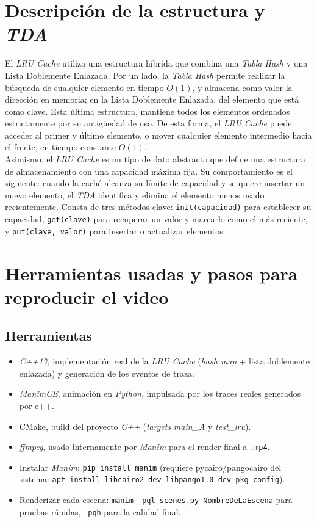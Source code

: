 \documentclass[a4paper, table]{article}
\begin{document}
\newpage

\section{Descripción de la estructura y \textit{TDA}}

El \textit{LRU Cache} utiliza una estructura híbrida que combina una \textit{Tabla Hash} y una Lista Doblemente Enlazada. Por un lado, la \textit{Tabla Hash} permite realizar la búsqueda de cualquier elemento en tiempo $O(1)$, y almacena como valor la dirección en memoria; en la Lista Doblemente Enlazada, del elemento que está como clave. Esta última estructura, mantiene todos los elementos ordenados estrictamente por su antigüedad de uso. De esta forma, el \textit{LRU Cache} puede acceder al primer y último elemento, o mover cualquier elemento intermedio hacia el frente, en tiempo constante $O(1)$. \\

Asimismo, el \textit{LRU Cache} es un tipo de dato abstracto que define una estructura de almacenamiento con una capacidad máxima fija. Su comportamiento es el siguiente: cuando la caché alcanza su límite de capacidad y se quiere insertar un nuevo elemento, el \textit{TDA} identifica y elimina el elemento menos usado recientemente. Consta de tres métodos clave: \texttt{init(capacidad)} para establecer su capacidad, \texttt{get(clave)} para recuperar un valor y marcarlo como el más reciente, y \texttt{put(clave, valor)} para insertar o actualizar elementos. 

\section{Herramientas usadas y pasos para reproducir el video}

\subsection{Herramientas}

\begin{itemize}
    \item \textit{C++17}, implementación real de la \textit{LRU Cache} (\textit{hash map} + lista doblemente enlazada) y generación de los eventos de traza.
    \item \textit{ManimCE}, animación en \textit{Python}, impulsada por los traces reales generados por c++.
    \item CMake, build del proyecto \textit{C++} (\textit{targets} \textit{main\_A} y \textit{test\_lru}).
    \item \textit{ffmpeg}, usado internamente por \textit{Manim} para el render final a \texttt{.mp4}.
    \item Instalar \textit{Manim}: \texttt{pip install manim} (requiere pycairo/pangocairo del sistema: \texttt{apt install libcairo2-dev libpango1.0-dev pkg-config}).
    \item Renderizar cada escena: \texttt{manim -pql scenes.py NombreDeLaEscena} para pruebas rápidas, \texttt{-pqh} para la calidad final. 

\end{itemize}
\end{document}
